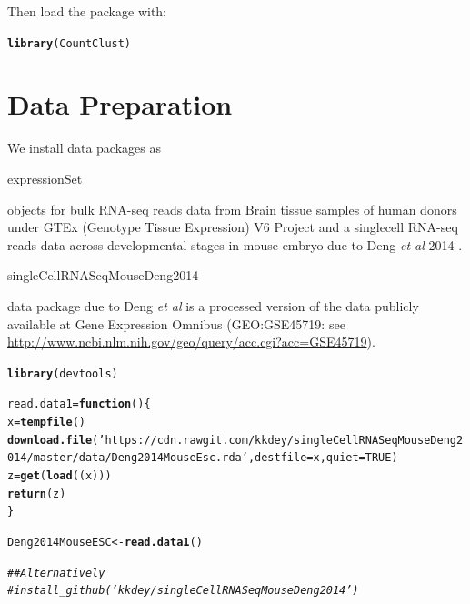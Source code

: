 \documentclass[12pt]{article}\usepackage[]{graphicx}\usepackage[usenames,dvipsnames]{color}
\makeatletter
\newcommand{\hlnum}[1]{\textcolor[rgb]{0.686,0.059,0.569}{#1}}%
\newcommand{\hlstr}[1]{\textcolor[rgb]{0.192,0.494,0.8}{#1}}%
\newcommand{\hlcom}[1]{\textcolor[rgb]{0.678,0.584,0.686}{\textit{#1}}}%
\newcommand{\hlstd}[1]{\textcolor[rgb]{0.345,0.345,0.345}{#1}}%
\newcommand{\hlkwa}[1]{\textcolor[rgb]{0.161,0.373,0.58}{\textbf{#1}}}%
\newcommand{\hlkwb}[1]{\textcolor[rgb]{0.69,0.353,0.396}{#1}}%
\newcommand{\hlkwc}[1]{\textcolor[rgb]{0.333,0.667,0.333}{#1}}%
\newcommand{\hlkwd}[1]{\textcolor[rgb]{0.737,0.353,0.396}{\textbf{#1}}}%
\newenvironment{kframe}{%
 \def\at@end@of@kframe{}%
 \ifinner\ifhmode%
  \def\at@end@of@kframe{\end{minipage}}%
  \begin{minipage}{\columnwidth}%
 \fi\fi%
 \def\FrameCommand##1{\hskip\@totalleftmargin \hskip-\fboxsep
 \colorbox{shadecolor}{##1}\hskip-\fboxsep
     \hskip-\linewidth \hskip-\@totalleftmargin \hskip\columnwidth}%
 \MakeFramed {\advance\hsize-\width
   \@totalleftmargin\z@ \linewidth\hsize
   \@setminipage}}%
 {\par\unskip\endMakeFramed%
 \at@end@of@kframe}
\newenvironment{knitrout}{}{} %
\makeatother
\begin{document}
Then load the package with:

\begin{knitrout}
\color{fgcolor}\begin{kframe}
\begin{alltt}
\hlkwd{library}\hlstd{(CountClust)}
\end{alltt}
\end{kframe}
\end{knitrout}

\section{Data Preparation}

We install data packages as \begin{verb} expressionSet \end{verb} objects for bulk RNA-seq reads data from Brain tissue samples of human donors under GTEx (Genotype Tissue Expression) V6 Project  \cite{GTEX2013} and a singlecell RNA-seq reads data across developmental stages in mouse embryo due to Deng \textit{et al} 2014 \cite{Deng2014}.


\begin{verb} singleCellRNASeqMouseDeng2014 \end{verb} data package due to Deng \textit{et al} is a processed version of the data publicly available at Gene Expression Omnibus (GEO:GSE45719: see \url{http://www.ncbi.nlm.nih.gov/geo/query/acc.cgi?acc=GSE45719}).


\begin{knitrout}
\color{fgcolor}\begin{kframe}
\begin{alltt}
\hlkwd{library}\hlstd{(devtools)}

\hlstd{read.data1} \hlkwb{=} \hlkwa{function}\hlstd{() \{}
  \hlstd{x} \hlkwb{=} \hlkwd{tempfile}\hlstd{()}
  \hlkwd{download.file}\hlstd{(}\hlstr{'https://cdn.rawgit.com/kkdey/singleCellRNASeqMouseDeng2014/master/data/Deng2014MouseEsc.rda'}\hlstd{,} \hlkwc{destfile}\hlstd{=x,} \hlkwc{quiet}\hlstd{=}\hlnum{TRUE}\hlstd{)}
  \hlstd{z} \hlkwb{=} \hlkwd{get}\hlstd{(}\hlkwd{load}\hlstd{((x)))}
  \hlkwd{return}\hlstd{(z)}
\hlstd{\}}

\hlstd{Deng2014MouseESC} \hlkwb{<-} \hlkwd{read.data1}\hlstd{()}

\hlcom{## Alternatively}
\hlcom{# install_github('kkdey/singleCellRNASeqMouseDeng2014')}
\end{alltt}
\end{kframe}
\end{knitrout}
\end{document}
